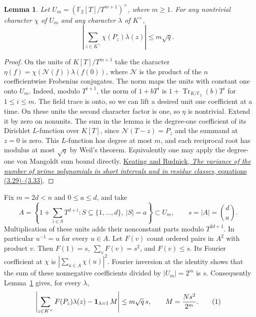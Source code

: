 \documentclass[11pt]{article}
\newtheorem{lemma}[theorem]{Lemma}
\newcommand{\F}{\mathbb F_2}
\begin{document}
\begin{lemma}\label{lem:weight-characters}
Let \(U_m=(\F[T]/T^{m+1})^\times\), where \(m\ge1\).
For any nontrivial character \(\chi\) of \(U_m\) and any character
\(\lambda\) of \(K^\times\),
\[
 \left|\sum_{z\in K^\times}\chi(P_z)\lambda(z)\right|\le m\sqrt q .
\]
\end{lemma}
\begin{proof}
On the units of \(K[T]/T^{m+1}\) take the character
\(\eta(f)=\chi(\mathcal N(f))\lambda(f(0))\), where \(\mathcal N\)
is the product of the \(n\) coefficientwise Frobenius conjugates.
The norm maps the units with constant one onto \(U_m\). Indeed,
modulo \(T^{i+1}\), the norm of \(1+bT^i\) is
\(1+\operatorname{Tr}_{K/\F}(b)T^i\) for \(1\le i\le m\).
The field trace is onto, so we can lift a desired unit one coefficient
at a time. On these units the second character factor is one, so
\(\eta\) is nontrivial. Extend it by zero on nonunits.
The sum in the lemma is the degree-one coefficient of its Dirichlet
\(L\)-function over \(K[T]\), since \(\mathcal N(T-z)=P_z\) and the
summand at \(z=0\) is zero. This \(L\)-function has degree at most
\(m\), and each reciprocal root has modulus at most \(\sqrt q\) by
Weil's theorem. Equivalently one may apply the degree-one
von Mangoldt sum bound directly.
\href{https://arxiv.org/pdf/1204.0708\#page=10}{Keating and Rudnick,
\emph{The variance of the number of prime polynomials in short intervals
and in residue classes}, equations (3.29)--(3.33)}.
\end{proof}

Fix \(m=2d<n\) and \(0\le a\le d\), and take
\[
 A=\left\{1+\sum_{i\in S}T^{d+i}:
       S\subseteq\{1,\ldots,d\},\ |S|=a\right\}\subset U_m,
 \qquad s=|A|=\binom da .
\]
Multiplication of these units adds their nonconstant parts modulo
\(T^{2d+1}\). In particular \(u^{-1}=u\) for every \(u\in A\).
Let \(F(v)\) count ordered pairs in \(A^2\) with product \(v\).
Then \(F(1)=s,\ \sum_v F(v)=s^2\), and \(F(v)\le s\). Its Fourier
coefficient at \(\chi\) is \(\left|\sum_{u\in A}\chi(u)\right|^2\).
Fourier inversion at the identity shows that the sum of these
nonnegative coefficients divided by \(|U_m|=2^m\) is \(s\).
Consequently Lemma~\ref{lem:weight-characters} gives, for every \(\lambda\),
\[
 \left|\sum_{z\in K^\times}F(P_z)\lambda(z)
       -{\bf1}_{\lambda=1}\,M\right|\le m\sqrt q\,s,
 \qquad M=\frac{Ns^2}{2^m}.
 \tag{1}\label{eq:weight-main}
\]
\end{document}
